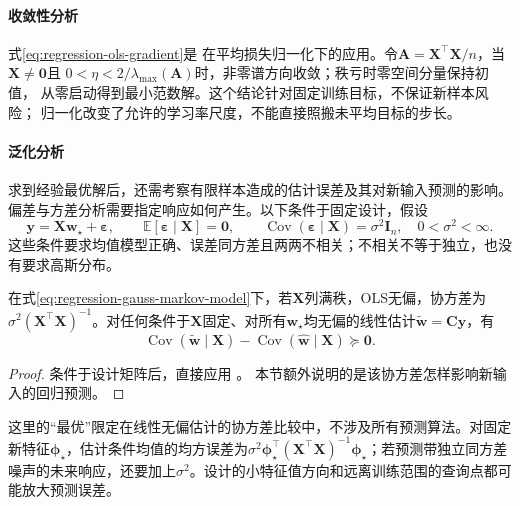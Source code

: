 \paragraph{收敛性分析}
式\eqref{eq:regression-ols-gradient}是
在平均损失归一化下的应用。令$\bm A=\bm X^\top\bm X/n$，当$\bm X\ne\bm0$且
$0<\eta<2/\lambda_{\max}(\bm A)$时，非零谱方向收敛；秩亏时零空间分量保持初值，
从零启动得到最小范数解。这个结论针对固定训练目标，不保证新样本风险；
归一化改变了允许的学习率尺度，不能直接照搬未平均目标的步长。

\paragraph{泛化分析}
求到经验最优解后，还需考察有限样本造成的估计误差及其对新输入预测的影响。偏差与方差分析需要指定响应如何产生。以下条件于固定设计，假设
\begin{equation}
  \bm{y}=\bm{X}\bm{w}_{\star}+\bm{\varepsilon},\qquad
  \mathbb{E}[\bm{\varepsilon}\mid\bm{X}]=\bm{0},\qquad
  \operatorname{Cov}(\bm{\varepsilon}\mid\bm{X})=\sigma^2\bm{I}_n,
  \quad 0<\sigma^2<\infty.
  \label{eq:regression-gauss-markov-model}
\end{equation}
这些条件要求均值模型正确、误差同方差且两两不相关；不相关不等于独立，也没有要求高斯分布。

\begin{theorem}
  \label{thm:regression-gauss-markov}
  在式\eqref{eq:regression-gauss-markov-model}下，若$\bm{X}$列满秩，OLS无偏，协方差为$\sigma^2(\bm{X}^{\top}\bm{X})^{-1}$。对任何条件于$\bm{X}$固定、对所有$\bm{w}_{\star}$均无偏的线性估计$\widetilde{\bm{w}}=\bm{C}\bm{y}$，有
  \[
    \operatorname{Cov}(\widetilde{\bm{w}}\mid\bm{X})
    -\operatorname{Cov}(\widehat{\bm{w}}\mid\bm{X})\succeq\bm{0}.
  \]
\end{theorem}

\begin{proof}
条件于设计矩阵后，直接应用
。
本节额外说明的是该协方差怎样影响新输入的回归预测。
\end{proof}

这里的“最优”限定在线性无偏估计的协方差比较中，不涉及所有预测算法。对固定新特征$\bm{\phi}_{\star}$，估计条件均值的均方误差为$\sigma^2\bm{\phi}_{\star}^{\top}(\bm{X}^{\top}\bm{X})^{-1}\bm{\phi}_{\star}$；若预测带独立同方差噪声的未来响应，还要加上$\sigma^2$。设计的小特征值方向和远离训练范围的查询点都可能放大预测误差。

